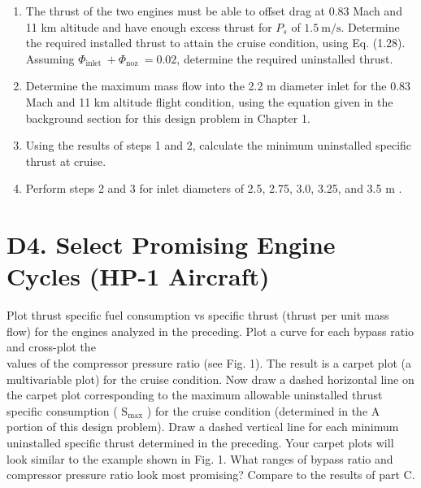 \documentclass[10pt]{article}
\begin{document}
\begin{enumerate}
  \item The thrust of the two engines must be able to offset drag at 0.83 Mach and 11 km altitude and have enough excess thrust for $P_{s}$ of $1.5 \mathrm{~m} / \mathrm{s}$. Determine the required installed thrust to attain the cruise condition, using Eq. (1.28). Assuming $\Phi_{\text {inlet }}+\Phi_{\text {noz }}=0.02$, determine the required uninstalled thrust.
  \item Determine the maximum mass flow into the 2.2 m diameter inlet for the 0.83 Mach and 11 km altitude flight condition, using the equation given in the background section for this design problem in Chapter 1.
  \item Using the results of steps 1 and 2, calculate the minimum uninstalled specific thrust at cruise.
  \item Perform steps 2 and 3 for inlet diameters of 2.5, 2.75, 3.0, 3.25, and 3.5 m .
\end{enumerate}

\section*{D4. Select Promising Engine Cycles (HP-1 Aircraft)}
Plot thrust specific fuel consumption vs specific thrust (thrust per unit mass flow) for the engines analyzed in the preceding. Plot a curve for each bypass ratio and cross-plot the\\
values of the compressor pressure ratio (see Fig. 1). The result is a carpet plot (a multivariable plot) for the cruise condition. Now draw a dashed horizontal line on the carpet plot corresponding to the maximum allowable uninstalled thrust specific consumption ( $\mathrm{S}_{\mathrm{max}}$ ) for the cruise condition (determined in the A portion of this design problem). Draw a dashed vertical line for each minimum uninstalled specific thrust determined in the preceding. Your carpet plots will look similar to the example shown in Fig. 1. What ranges of bypass ratio and compressor pressure ratio look most promising? Compare to the results of part C.
\end{document}
